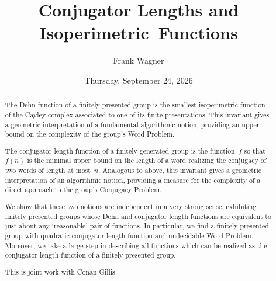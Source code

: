 \documentclass{UAmathtalk}
\author{Frank Wagner}
\title{Conjugator Lengths and Isoperimetric~Functions}
\date{Thursday, September 24, 2026}
\begin{document}
\maketitle

\begin{abstract}
The Dehn function of a finitely presented group is the smallest isoperimetric function of the Cayley complex associated to one of its finite presentations.  This invariant gives a geometric interpretation of a fundamental algorithmic notion, providing an upper bound on the complexity of the group’s Word Problem.

The conjugator length function of a finitely generated group is the function~$f$ so that $f(n)$ is the minimal upper bound on the length of a word realizing the conjugacy of two words of length at most~$n$.  Analogous to above, this invariant gives a geometric interpretation of an algorithmic notion, providing a measure for the complexity of a direct approach to the group’s Conjugacy Problem.

We show that these two notions are independent in a very strong sense, exhibiting finitely presented groups whose Dehn and conjugator length functions are equivalent to just about any `reasonable' pair of functions.  In particular, we find a finitely presented group with quadratic conjugator length function and undecidable Word Problem.  Moreover, we take a large step in describing all functions which can be realized as the conjugator length function of a finitely presented group.

This is joint work with Conan Gillis.
\end{abstract}
\end{document}
